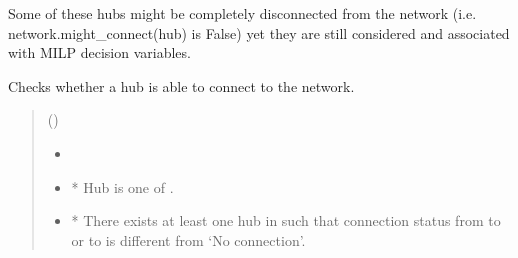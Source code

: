 \documentclass[letterpaper,10pt,english]{sphinxmanual}
\begin{document}
\begin{fulllineitems}
\begin{fulllineitems}
\sphinxAtStartPar
Some of these hubs might be completely disconnected from the network
(i.e. network.might\_connect(hub) is False) yet they are still considered and associated with MILP decision variables.

\end{fulllineitems}


\begin{fulllineitems}
\label{\detokenize{generated/tamos.network.HREThermalNetwork:tamos.network.HREThermalNetwork.might_connect}}
\pysigstartsignatures
{}
\pysigstopsignatures
\sphinxAtStartPar
Checks whether a hub is able to connect to the network.
\begin{quote}\begin{description}
\sphinxAtStartPar
{} ({\hyperref[\detokenize{generated/tamos.Hub:tamos.Hub}]{}}) \textendash{} 

\sphinxAtStartPar
\begin{itemize}
\item {} 
\sphinxAtStartPar
{}

\item {} 
\sphinxAtStartPar
* Hub  is one of .

\item {} 
\sphinxAtStartPar
* There exists at least one hub  in  such that connection status from  to  or  to  \textendash{} is different from ‘No connection’.

\end{itemize}


\end{description}\end{quote}

\end{fulllineitems}



\end{fulllineitems}
\end{document}
